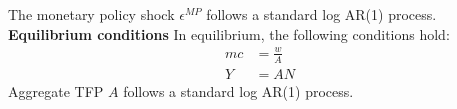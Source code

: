   The monetary policy shock $\epsilon^{MP}$ follows a standard log AR(1) process.
    \\
  \textbf{Equilibrium conditions} \hspace{3mm} In equilibrium, the following conditions hold:
  \begin{align*}
    mc &= \frac{w}{A}
    \\
    Y &= AN
  \end{align*}
  Aggregate TFP $A$ follows a standard log AR(1) process.


